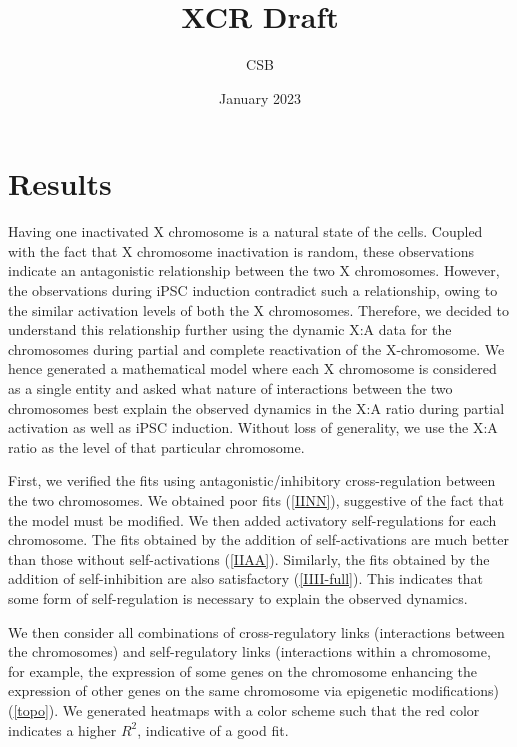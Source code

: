 \documentclass[11pt,a4paper]{article}
\title{XCR Draft}
\author{CSB}
\date{January 2023}
\begin{document}
\maketitle

\section{Results}

Having one inactivated X chromosome is a natural state of the cells. Coupled with the fact that X chromosome inactivation is random, these observations indicate an antagonistic relationship between the two X chromosomes. However, the observations during iPSC induction contradict such a relationship, owing to the similar activation levels of both the X chromosomes. Therefore, we decided to understand this relationship further using the dynamic X:A data for the chromosomes during partial and complete reactivation of the X-chromosome. We hence generated a mathematical model where each X chromosome is considered as a single entity and asked what nature of interactions between the two chromosomes best explain the observed dynamics in the X:A ratio during partial activation as well as iPSC induction. Without loss of generality, we use the X:A ratio as the level of that particular chromosome.

First, we verified the fits using antagonistic/inhibitory cross-regulation between the two chromosomes. We obtained poor fits (\autoref{IINN}), suggestive of the fact that the model must be modified. We then added activatory self-regulations for each chromosome. The fits obtained by the addition of self-activations are much better than those without self-activations (\autoref{IIAA}). Similarly, the fits obtained by the addition of self-inhibition are also satisfactory (\autoref{IIII-full}). This indicates that some form of self-regulation is necessary to explain the observed dynamics.

We then consider all combinations of cross-regulatory links (interactions between the chromosomes) and self-regulatory links (interactions within a chromosome, for example, the expression of some genes on the chromosome enhancing the expression of other genes on the same chromosome via epigenetic modifications) (\autoref{topo}). We generated heatmaps with a color scheme such that the red color indicates a higher $R^2$, indicative of a good fit.
\end{document}
